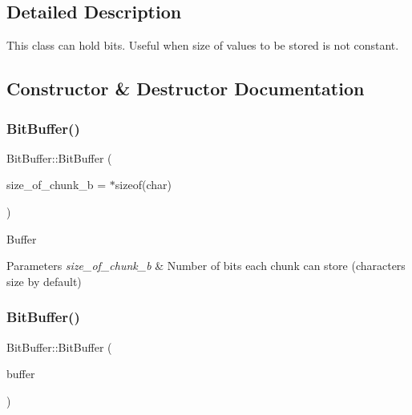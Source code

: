 \subsection{Detailed Description}
This class can hold bits. Useful when size of values to be stored is not constant. 

\subsection{Constructor \& Destructor Documentation}
\mbox{\label{class_bit_buffer_a01ccbe0835f8aaa203720d6c4f99b68e}} 
\subsubsection{\texorpdfstring{Bit\+Buffer()}{BitBuffer()}\hspace{0.1cm}{\footnotesize\ttfamily [1/2]}}
{\footnotesize\ttfamily Bit\+Buffer\+::\+Bit\+Buffer (\begin{DoxyParamCaption}\item[{int}]{size\+\_\+of\+\_\+chunk\+\_\+b = {$\ast$sizeof(char)} }\end{DoxyParamCaption})}

Buffer 
\begin{DoxyParams}{Parameters}
{\em size\+\_\+of\+\_\+chunk\+\_\+b} & Number of bits each chunk can store (character\textquotesingle{}s size by default) \\
\hline
\end{DoxyParams}
\mbox{\label{class_bit_buffer_af78925f3b1d992d934545616c1d00dd2}} 
\subsubsection{\texorpdfstring{Bit\+Buffer()}{BitBuffer()}\hspace{0.1cm}{\footnotesize\ttfamily [2/2]}}
{\footnotesize\ttfamily Bit\+Buffer\+::\+Bit\+Buffer (\begin{DoxyParamCaption}\item[{const \hyperlink{class_bit_buffer}{Bit\+Buffer} \&}]{buffer }\end{DoxyParamCaption})}

